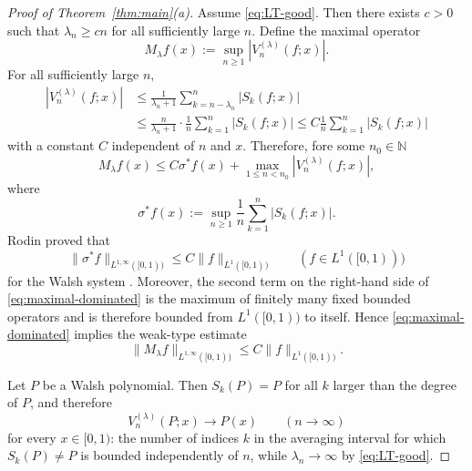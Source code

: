 \documentclass[11pt]{amsart}
\numberwithin{equation}{section}
\theoremstyle{plain}
\begin{document}
\begin{proof}[Proof of Theorem~\protect\ref{thm:main}(a)]
Assume \eqref{eq:LT-good}. Then there exists $c>0$ such that $\lambda_n\ge
cn $ for all sufficiently large $n$. Define the maximal operator 
\begin{equation*}
M_{\lambda}f(x):=\sup_{n\ge1} |V_n^{(\lambda)}(f;x)|.
\end{equation*}
For all sufficiently large $n$, 
\begin{align*}
|V_n^{(\lambda)}(f;x)| &\le \frac{1}{\lambda_n+1}\sum_{k=n-\lambda_n}^{n}
|S_k(f;x)| \\
&\le \frac{n}{\lambda_n+1}\cdot \frac{1}{n}\sum_{k=1}^{n} |S_k(f;x)| \le C%
\frac{1}{n}\sum_{k=1}^{n} |S_k(f;x)|
\end{align*}
with a constant $C$ independent of $n$ and $x$. Therefore, fore some $n_0
\in \mathbb{N}$ 
\begin{equation}  \label{eq:maximal-dominated}
M_{\lambda}f(x)\le C\sigma^{*}f(x)+\max_{1\le n<n_0} |V_n^{(\lambda)}(f;x)|,
\end{equation}
where 
\begin{equation*}
\sigma^{*}f(x):=\sup_{n\ge1} \frac{1}{n}\sum_{k=1}^{n} |S_k(f;x)|.
\end{equation*}
Rodin proved that 
\begin{equation}  \label{eq:Rodin}
\|\sigma^{*}f\|_{L^{1,\infty}([0,1))}\le C\|f\|_{L^{1}([0,1))} \qquad (f\in
L^{1}([0,1)))
\end{equation}
for the Walsh system \cite{Rodin}. Moreover, the second term on the
right-hand side of \eqref{eq:maximal-dominated} is the maximum of finitely
many fixed bounded operators and is therefore bounded from $L^{1}([0,1))$ to
itself. Hence \eqref{eq:maximal-dominated} implies the weak-type estimate 
\begin{equation}  \label{eq:Mlambda-weak}
\|M_{\lambda}f\|_{L^{1,\infty}([0,1))}\le C\|f\|_{L^{1}([0,1))}.
\end{equation}

Let $P$ be a Walsh polynomial. Then $S_k(P)=P$ for all $k$ larger than the
degree of $P$, and therefore 
\begin{equation*}
V_n^{(\lambda)}(P;x)\longrightarrow P(x) \qquad (n\to\infty)
\end{equation*}
for every $x\in[0,1)$: the number of indices $k$ in the averaging interval
for which $S_k(P)\ne P$ is bounded independently of $n$, while $%
\lambda_n\to\infty$ by \eqref{eq:LT-good}.


\end{proof}
\end{document}
